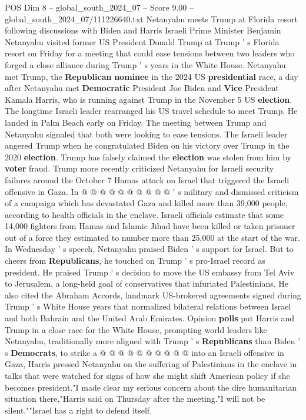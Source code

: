 \begin{textsample}{POS Dim 8 – global\_south\_2024\_07 – Score 9.00 – global\_south\_2024\_07/111226640.txt}  \label{ex:f8_pos_107}
Netanyahu meets Trump at Florida resort following discussions with Biden and Harris Israeli Prime Minister Benjamin Netanyahu visited former US President Donald Trump at Trump ' s Florida resort on Friday for a meeting that could ease tensions between two leaders who forged a close alliance during Trump ' s years in the White House.
Netanyahu met Trump, the \textbf{Republican} \textbf{nominee} in the 2024 US \textbf{presidential} race, a day after Netanyahu met \textbf{Democratic} President Joe Biden and \textbf{Vice} President Kamala Harris, who is running against Trump in the November 5 US \textbf{election}.
The longtime Israeli leader rearranged his US travel schedule to meet Trump.
He landed in Palm Beach early on Friday.
The meeting between Trump and Netanyahu signaled that both were looking to ease tensions.
The Israeli leader angered Trump when he congratulated Biden on his victory over Trump in the 2020 \textbf{election}.
Trump has falsely claimed the \textbf{election} was stolen from him by \textbf{voter} fraud.
Trump more recently criticized Netanyahu for Israeli security failures around the October 7 Hamas attack on Israel that triggered the Israeli offensive in Gaza.
In @ @ @ @ @ @ @ @ @ @ ' s military and dismissed criticism of a campaign which has devastated Gaza and killed more than 39,000 people, according to health officials in the enclave.
Israeli officials estimate that some 14,000 fighters from Hamas and Islamic Jihad have been killed or taken prisoner out of a force they estimated to number more than 25,000 at the start of the war.
In Wednesday ' s speech, Netanyahu praised Biden ' s support for Israel.
But to cheers from \textbf{Republicans}, he touched on Trump ' s pro-Israel record as president.
He praised Trump ' s decision to move the US embassy from Tel Aviv to Jerusalem, a long-held goal of conservatives that infuriated Palestinians.
He also cited the Abraham Accords, landmark US-brokered agreements signed during Trump ' s White House years that normalized bilateral relations between Israel and both Bahrain and the United Arab Emirates.
Opinion \textbf{polls} put Harris and Trump in a close race for the White House, prompting world leaders like Netanyahu, traditionally more aligned with Trump ' s \textbf{Republicans} than Biden ' s \textbf{Democrats}, to strike a @ @ @ @ @ @ @ @ @ @ into an Israeli offensive in Gaza, Harris pressed Netanyahu on the suffering of Palestinians in the enclave in talks that were watched for signs of how she might shift American policy if she becomes president."I made clear my serious concern about the dire humanitarian situation there,"Harris said on Thursday after the meeting."I will not be silent.""Israel has a right to defend itself.

\end{textsample}
